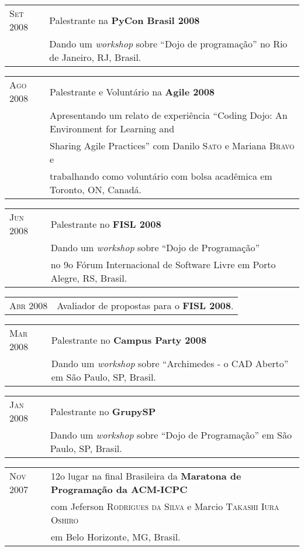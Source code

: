 \documentclass[letter,10pt]{article}
\begin{document}
\begin{tabular}{p{2.5cm}l}
  \textsc{Set 2008} & Palestrante na \textbf{PyCon Brasil 2008}\\
  & Dando um \textit{workshop} sobre ``Dojo de programação'' no Rio de Janeiro, RJ, Brasil.\\
\end{tabular}

\begin{tabular}{p{2.5cm}l}
  \textsc{Ago 2008} & Palestrante e Voluntário na \textbf{Agile 2008}\\
  &Apresentando um relato de experiência ``Coding Dojo: An Environment for
  Learning and\\
  & Sharing Agile Practices'' com Danilo \textsc{Sato} e Mariana \textsc{Bravo} e\\
  & trabalhando como voluntário com bolsa acadêmica em Toronto, ON, Canadá.\\
\end{tabular}

\begin{tabular}{p{2.5cm}l}
  \textsc{Jun 2008} & Palestrante no \textbf{FISL 2008}\\
  &Dando um \textit{workshop} sobre ``Dojo de Programação''\\
  & no 9o Fórum Internacional de Software Livre em Porto
  Alegre, RS, Brasil.\\
\end{tabular}

\begin{tabular}{p{2.5cm}l}
  \textsc{Abr 2008} & Avaliador de propostas para o \textbf{FISL 2008}.\\
\end{tabular}

\begin{tabular}{p{2.5cm}l}
  \textsc{Mar 2008} & Palestrante no \textbf{Campus Party 2008}\\
  &Dando um \textit{workshop} sobre ``Archimedes - o CAD Aberto'' em São Paulo, SP, Brasil.\\
\end{tabular}

\begin{tabular}{p{2.5cm}l}
  \textsc{Jan 2008} & Palestrante no \textbf{GrupySP}\\
  &Dando um \textit{workshop} sobre ``Dojo de Programação'' em São Paulo, SP, Brasil.\\
\end{tabular}

\begin{tabular}{p{2.5cm}l}
  \textsc{Nov 2007} & 12o lugar na final Brasileira da
  \textbf{Maratona de Programação da ACM-ICPC}\\
  & com Jeferson \textsc{Rodrigues da Silva} e Marcio
  \textsc{Takashi Iura Oshiro}\\
  & em Belo Horizonte, MG, Brasil.\\
\end{tabular}
\end{document}
